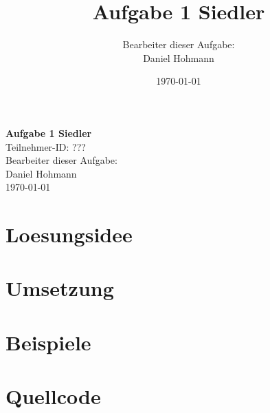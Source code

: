 \documentclass{article}
\title{\Huge{\textbf{Aufgabe 1 Siedler}} \\ \centering{\LARGE{Teilnahme-ID: ?????}}}
\author{Bearbeiter dieser Aufgabe: \\ Daniel Hohmann}
\date{\today}
\begin{document}
\thispagestyle{empty}
\begin{center}
\Huge{\textbf{Aufgabe 1 Siedler}}
\\
\LARGE{Teilnehmer-ID: ???}
\\
\LARGE{Bearbeiter dieser Aufgabe: \\ Daniel Hohmann}
\\
\LARGE{\today}
\end{center}
\newpage
\setcounter{page}{1}
\tableofcontents
\newpage
\section{Loesungsidee}
\begin{center}

\end{center}
\section{Umsetzung}
\begin{center}

\end{center}
\section{Beispiele}
\begin{center}

\end{center}
\section{Quellcode}
\begin{center}

\end{center}
\end{document}
